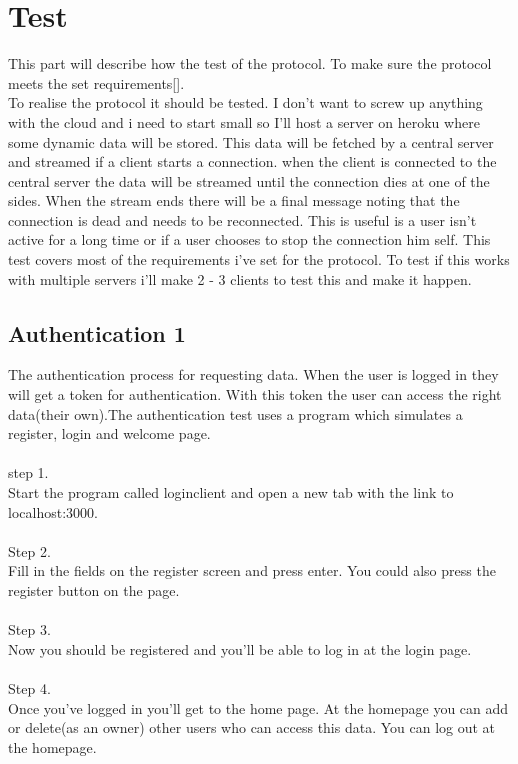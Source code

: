 \documentclass{article}
\begin{document}
\cleardoublepage
\section{Test}\label{sec:test}
This part will describe how the test of the protocol. To make sure the protocol meets the set requirements[\pageref{sec:requirements}].\\
To realise the protocol it should be tested. I don't want to screw up anything with the cloud and i need to start small so I'll host a server on heroku where some dynamic data will be stored. This data will be fetched by a central server and streamed if a client starts a connection. when the client is connected to the central server the data will be streamed until the connection dies at one of the sides. When the stream ends there will be a final message noting that the connection is dead and needs to be reconnected. This is useful is a user isn't active for a long time or if a user chooses to stop the connection him self. This test covers most of the requirements i've set for the protocol. To test if this works with multiple servers i'll make 2 - 3 clients to test this and make it happen. \\

\subsection{Authentication 1}\label{authentication1}
The authentication process for requesting data. When the user is logged in they will get a token for authentication. With this token the user can access the right data(their own).The authentication test uses a program which simulates a register, login and welcome page. \\
\\
step 1.
\\
Start the program called loginclient and open a new tab with the link to localhost:3000.\\
\\
Step 2.
\\
Fill in the fields on the register screen and press enter. You could also press the register button on the page. \\
\\
Step 3. \\
Now you should be registered and you'll be able to log in at the login page. \\
\\
Step 4.\\
Once you've logged in you'll get to the home page. At the homepage you can add or delete(as an owner) other users who can access this data. You can log out at the homepage.\\
\\
\end{document}
